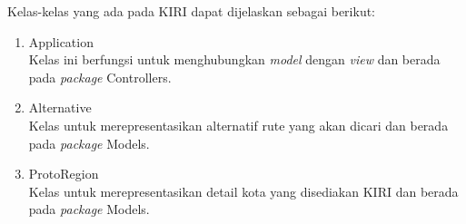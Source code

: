 Kelas-kelas yang ada pada KIRI dapat dijelaskan sebagai berikut:

\begin{enumerate}
	\item Application\\
			Kelas ini berfungsi untuk menghubungkan \textit{model} dengan \textit{view} dan berada pada \textit{package} Controllers.
	\item Alternative\\
			Kelas untuk merepresentasikan alternatif rute yang akan dicari dan berada pada \textit{package} Models.
	\item ProtoRegion\\
			Kelas untuk merepresentasikan detail kota yang disediakan KIRI dan berada pada \textit{package} Models.
\end{enumerate}
